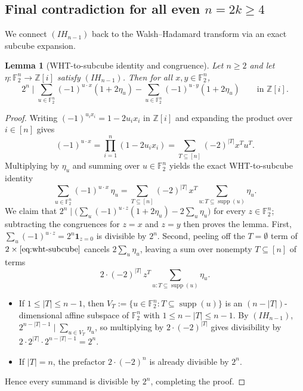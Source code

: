 \documentclass[11pt,a4paper]{article}
\theoremstyle{plain}
\newtheorem{lemma}{Lemma}[section]
\theoremstyle{definition}
\theoremstyle{remark}
\newcommand{\F}{\mathbb{F}}
\newcommand{\Zi}{\mathbb{Z}[i]}
\newcommand{\supp}{\operatorname{supp}}
\newcommand{\abs}[1]{\lvert#1\rvert}
\newcommand{\indic}[1]{\mathbf{1}_{#1}}
\numberwithin{equation}{section}
\begin{document}
\subsection{Final contradiction for all even \texorpdfstring{$n = 2k \ge 4$}{n = 2k >= 4}}\label{sec:final-kill}

We connect $(IH_{n-1})$ back to the Walsh--Hadamard transform via an exact subcube expansion.

\begin{lemma}[WHT-to-subcube identity and congruence]\label{lem:wht-subcube}
Let $n \ge 2$ and let $\eta : \F_2^n \to \Zi$ satisfy $(IH_{n-1})$. Then for all $x, y \in \F_2^n$,
\[
  2^n \;\Big|\; \sum_{u \in \F_2^n} (-1)^{u \cdot x}(1 + 2\eta_u) - \sum_{u \in \F_2^n} (-1)^{u \cdot y}(1 + 2\eta_u) \qquad \text{in } \Zi.
\]
\end{lemma}

\begin{proof}
Writing $(-1)^{u_i x_i} = 1 - 2 u_i x_i$ in $\Zi$ and expanding the product over $i \in [n]$ gives
\[
  (-1)^{u \cdot x} = \prod_{i=1}^n (1 - 2 u_i x_i) = \sum_{T \subseteq [n]} (-2)^{\abs{T}} x^T u^T.
\]
Multiplying by $\eta_u$ and summing over $u \in \F_2^n$ yields the exact WHT-to-subcube identity
\begin{equation}\label{eq:wht-subcube}
  \sum_{u \in \F_2^n} (-1)^{u \cdot x}\,\eta_u
  = \sum_{T \subseteq [n]} (-2)^{\abs{T}}\, x^T \sum_{u : T \subseteq \supp(u)} \eta_u.
\end{equation}
We claim that $2^n \mid \bigl(\sum_u (-1)^{u \cdot z}(1 + 2\eta_u) - 2\sum_u \eta_u\bigr)$ for every $z \in \F_2^n$; subtracting the congruences for $z = x$ and $z = y$ then proves the lemma. First, $\sum_u (-1)^{u \cdot z} = 2^n \indic{z = 0}$ is divisible by $2^n$. Second, peeling off the $T = \emptyset$ term of $2 \times \eqref{eq:wht-subcube}$ cancels $2\sum_u \eta_u$, leaving a sum over nonempty $T \subseteq [n]$ of terms
\[
  2 \cdot (-2)^{\abs{T}}\, z^T \sum_{u : T \subseteq \supp(u)} \eta_u.
\]
\begin{itemize}[leftmargin=1.8em]
  \item If $1 \le \abs{T} \le n - 1$, then $V_T := \{u \in \F_2^n : T \subseteq \supp(u)\}$ is an $(n - \abs{T})$-dimensional affine subspace of $\F_2^n$ with $1 \le n - \abs{T} \le n - 1$. By $(IH_{n-1})$, $2^{n - \abs{T} - 1} \mid \sum_{u \in V_T} \eta_u$, so multiplying by $2 \cdot (-2)^{\abs{T}}$ gives divisibility by $2 \cdot 2^{\abs{T}} \cdot 2^{n - \abs{T} - 1} = 2^n$.
  \item If $\abs{T} = n$, the prefactor $2 \cdot (-2)^n$ is already divisible by $2^n$.
\end{itemize}
Hence every summand is divisible by $2^n$, completing the proof.
\end{proof}
\end{document}
